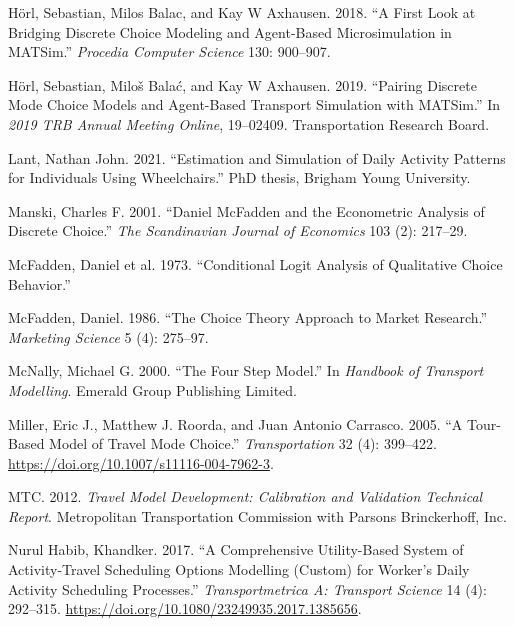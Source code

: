 \documentclass[12pt, oneside, openright]{byuthesis}
\newlength{\cslhangindent}
\newlength{\cslentryspacingunit} %
\newenvironment{CSLReferences}[2] %
 {%
  \setlength{\parindent}{0pt}
  \ifodd #1
  \let\oldpar\par
  \def\par{\hangindent=\cslhangindent\oldpar}
  \fi
  \setlength{\parskip}{#2\cslentryspacingunit}
 }%
 {}
\begin{document}
\begin{CSLReferences}{1}{0}
\leavevmode{}%
Hörl, Sebastian, Milos Balac, and Kay W Axhausen. 2018. {``A First Look at Bridging Discrete Choice Modeling and Agent-Based Microsimulation in MATSim.''} \emph{Procedia Computer Science} 130: 900--907.

\leavevmode{}%
Hörl, Sebastian, Miloš Balać, and Kay W Axhausen. 2019. {``Pairing Discrete Mode Choice Models and Agent-Based Transport Simulation with MATSim.''} In \emph{2019 TRB Annual Meeting Online}, 19--02409. Transportation Research Board.

\leavevmode{}%
Lant, Nathan John. 2021. {``Estimation and Simulation of Daily Activity Patterns for Individuals Using Wheelchairs.''} PhD thesis, Brigham Young University.

\leavevmode{}%
Manski, Charles F. 2001. {``Daniel McFadden and the Econometric Analysis of Discrete Choice.''} \emph{The Scandinavian Journal of Economics} 103 (2): 217--29.

\leavevmode{}%
McFadden, Daniel et al. 1973. {``Conditional Logit Analysis of Qualitative Choice Behavior.''}

\leavevmode{}%
McFadden, Daniel. 1986. {``The Choice Theory Approach to Market Research.''} \emph{Marketing Science} 5 (4): 275--97.

\leavevmode{}%
McNally, Michael G. 2000. {``The Four Step Model.''} In \emph{Handbook of Transport Modelling}. Emerald Group Publishing Limited.

\leavevmode{}%
Miller, Eric J., Matthew J. Roorda, and Juan Antonio Carrasco. 2005. {``A Tour-Based Model of Travel Mode Choice.''} \emph{Transportation} 32 (4): 399--422. \url{https://doi.org/10.1007/s11116-004-7962-3}.

\leavevmode{}%
MTC. 2012. \emph{Travel Model Development: Calibration and Validation Technical Report}. Metropolitan Transportation Commission with Parsons Brinckerhoff, Inc.

\leavevmode{}%
Nurul Habib, Khandker. 2017. {``A Comprehensive Utility-Based System of Activity-Travel Scheduling Options Modelling (Custom) for Worker's Daily Activity Scheduling Processes.''} \emph{Transportmetrica A: Transport Science} 14 (4): 292--315. \url{https://doi.org/10.1080/23249935.2017.1385656}.


\end{CSLReferences}
\end{document}
